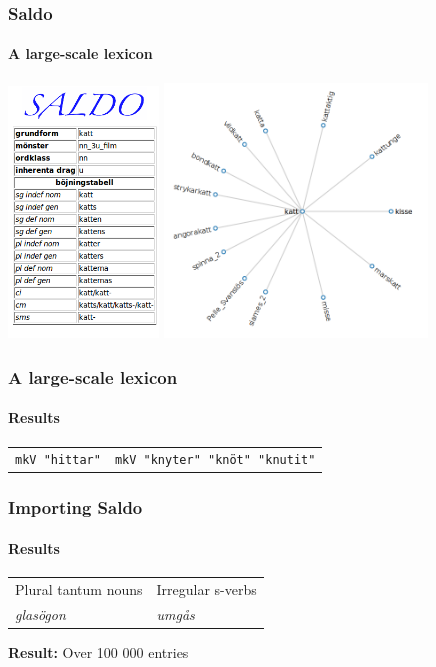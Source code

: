 \documentclass[10pt]{beamer}
\begin{document}
\begin{frame}
\frametitle{Saldo}
\framesubtitle{A large-scale lexicon}
\includegraphics[width=40mm]{saldotab.png}
\includegraphics[width=70mm]{saldograph.png}
\end{frame}


\begin{frame}[containsverbatim]
\frametitle{A large-scale lexicon}
\framesubtitle{Results} 
\begin{tabular}{ll}
\verb-mkV "hittar"- &
\verb-mkV "knyter" "knöt" "knutit"-\\
\end{tabular}
\end{frame}

\begin{frame}
\frametitle{Importing Saldo}
\framesubtitle{Results} 
\begin{tabular}{ll}
Plural tantum nouns & Irregular s-verbs \\
\emph{glasögon} & \emph{umgås}\\
\end{tabular}
\textbf{Result:} Over 100 000 entries
\end{frame}
\end{document}
